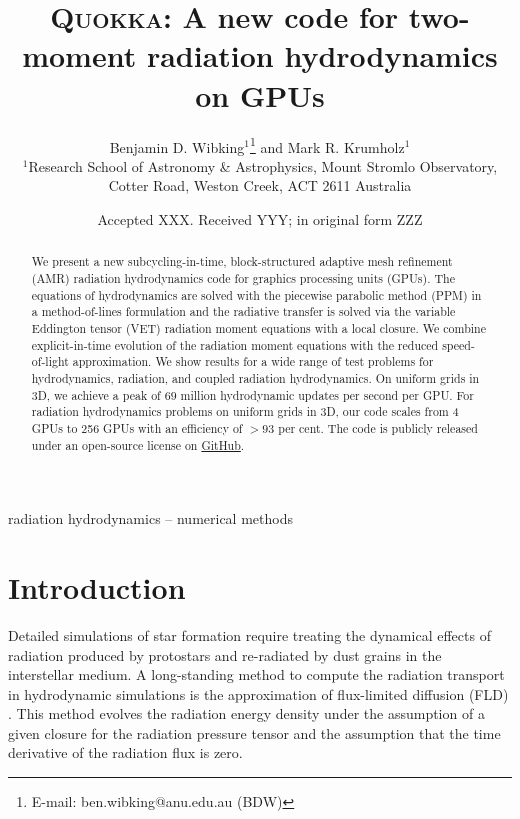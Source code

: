 \documentclass[fleqn,usenatbib]{mnras}
\title[Two-moment radiation hydrodynamics on GPUs]{\textsc{Quokka}: A new code for two-moment radiation hydrodynamics on GPUs}
\author[B. D. Wibking et al.]{
    Benjamin D. Wibking$^{1}$\thanks{E-mail: ben.wibking@anu.edu.au (BDW)}
    and Mark R. Krumholz$^{1}$
\\
$^{1}$Research School of Astronomy \& Astrophysics, Mount Stromlo Observatory, Cotter Road, Weston Creek, ACT 2611 Australia\\
}
\date{Accepted XXX. Received YYY; in original form ZZZ}
\begin{document}
\label{firstpage}
\pagerange{\pageref{firstpage}--\pageref{lastpage}}
\maketitle

\begin{abstract}
    We present a new subcycling-in-time, block-structured adaptive mesh refinement (AMR) radiation hydrodynamics code for graphics processing units (GPUs). The equations of hydrodynamics are solved with the piecewise parabolic method (PPM) in a method-of-lines formulation and the radiative transfer is solved via the variable Eddington tensor (VET) radiation moment equations with a local closure. We combine explicit-in-time evolution of the radiation moment equations with the reduced speed-of-light approximation. We show results for a wide range of test problems for hydrodynamics, radiation, and coupled radiation hydrodynamics. On uniform grids in 3D, we achieve a peak of $69$ million hydrodynamic updates per second per GPU. For radiation hydrodynamics problems on uniform grids in 3D, our code scales from 4 GPUs to 256 GPUs with an efficiency of $>93$ per cent. The code is publicly released under an open-source license on \faGithub\href{https://github.com/BenWibking/quokka-code}{GitHub}.
\end{abstract}

\begin{keywords}
radiation hydrodynamics -- numerical methods
\end{keywords}



\section{Introduction}
Detailed simulations of star formation require treating the dynamical effects of radiation produced by protostars and re-radiated by dust grains in the interstellar medium. A long-standing method to compute the radiation transport in hydrodynamic simulations is the approximation of flux-limited diffusion (FLD) \citep{Alme_1973}. This method evolves the radiation energy density under the assumption of a given closure for the radiation pressure tensor and the assumption that the time derivative of the radiation flux is zero.
\end{document}
